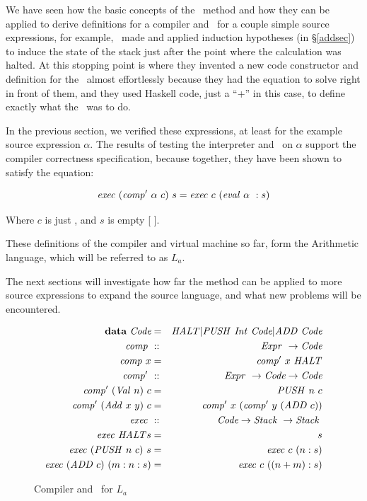 \documentclass {article}
\begin{document}
We have seen how the basic concepts of the \BH\ method and
how they can be applied to derive definitions
for a compiler and \vm\ for a couple simple source 
expressions, for example, \BH\ made and applied induction
hypotheses (in \S\ref{addsec}) to induce 
the state of the stack just after the
point where the calculation was halted.
At this stopping point is where 
they invented a new code constructor and 
definition for the \vm\
almost effortlessly because they had the equation
to solve right in front of them, and they
used Haskell code, just a ``+'' in this case, 
to define exactly what the \vm\ was to do.

In the previous section, we verified these expressions, 
at least for the example source expression $\alpha$.
The results of testing the interpreter and \vm\ on $\alpha$
 support the compiler correctness specification,
because together, they have been shown to satisfy the equation:

\[ \Exec (\Compp \alpha\ c)\ s = \Exec c\ (\evalf \alpha\ : s) \]

\noindent Where $c$ is just \HALTt, and $s$ is empty [ ].

These definitions of the compiler and virtual machine so far,
form the Arithmetic language, which will be referred to as $L_a$.

The next sections will investigate how 
far the method can be applied to
more source expressions to expand the source language,
and what new problems will be encountered.

\begin{figure}[h]
\centering 
\begin{eqnarray*}
	\textbf{data}\  \textit{Code} &=& \mathit{HALT} |
			 \mathit{PUSH\ } \mathit{Int\ } \textit{Code} | \mathit{ADD\ } \textit{Code}  \\
	\mathit{comp\ } &::& \mathit{Expr\ } \rightarrow \textit{Code} \\
	\mathit{comp\ } x &=& \mathit{comp'\ }  x\ \mathit{HALT} \\
	\mathit{comp'\ } &::& \mathit{Expr\ } \rightarrow \textit{Code} \rightarrow \textit{Code}  \\
	\mathit{comp'\ }  (\mathit{Val\ } n)\ c &=& \mathit{PUSH\ } n\ c \\
	\mathit{comp'\ }  (\mathit{Add\ } x\ y)\ c 
				&=& \mathit{comp'\ }  x\ (\mathit{comp'\ }  y\ (\mathit{ADD\ } c))\\
	\mathit{exec\ } &::& \textit{Code}  \rightarrow \textit{Stack\ } \rightarrow \textit{Stack\ }  \\
	\mathit{exec\ } \mathit{HALT} s &=& s  \\
	\mathit{exec\ } (\mathit{PUSH\ } n\ c)\ s &=& \mathit{exec\ } c\ (n:s) \\
	\mathit{exec\ } (\mathit{ADD\ } c)\ (m:n:s) &=& \mathit{exec\ } c\ ((n + m):s)  \\
\end{eqnarray*}
\caption{Compiler and \vm\ for $L_a$}
\end{figure}
\end{document}
